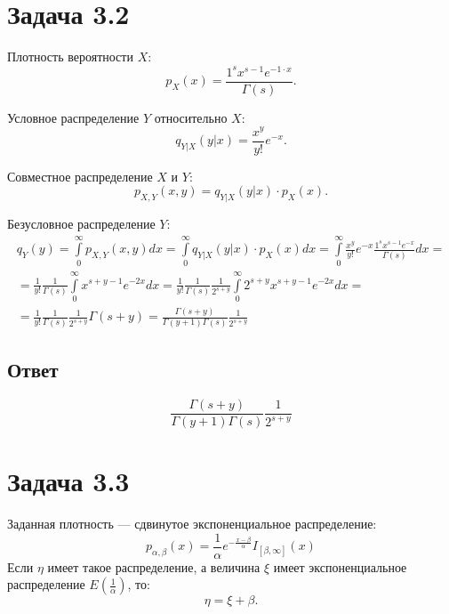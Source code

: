 \section*{Задача 3.2}
Плотность вероятности $X$:
\begin{equation}
    p_X(x) = \frac{1^s x^{s-1}e^{-1 \cdot x}}{\Gamma(s)} .
\end{equation}

Условное распределение $Y$ относительно $X$:
\begin{equation}
    q_{Y|X}(y|x) = \frac{x^y}{y!} e^{-x} .
\end{equation}

Совместное распределение $X$ и $Y$:
\begin{equation}
    p_{X,Y}(x,y) = q_{Y|X}(y|x) \cdot p_X(x) .
\end{equation}

Безусловное распределение $Y$:
\begin{multline}
    q_Y(y)
    = \int \limits_{0}^{\infty} p_{X,Y}(x,y) dx
    = \int \limits_{0}^{\infty} q_{Y|X}(y|x) \cdot p_X(x) dx
    = \int \limits_{0}^{\infty} \frac{x^y}{y!} e^{-x} \frac{1^s x^{s-1}e^{-x}}{\Gamma(s)} dx = \\
    = \frac{1}{y!} \frac{1}{\Gamma(s)} \int \limits_{0}^{\infty} x^{s+y-1}e^{-2 x} dx
    = \frac{1}{y!} \frac{1}{\Gamma(s)} \frac{1}{2^{s+y}} \int \limits_{0}^{\infty} 2^{s+y} x^{s+y-1}e^{-2 x} dx = \\
    = \frac{1}{y!} \frac{1}{\Gamma(s)} \frac{1}{2^{s+y}} \Gamma(s+y)
    = \frac{\Gamma(s+y)}{\Gamma(y+1) \Gamma(s)} \frac{1}{2^{s+y}}
\end{multline}

\subsection*{Ответ}
\begin{equation}
    \frac{\Gamma(s+y)}{\Gamma(y+1) \Gamma(s)} \frac{1}{2^{s+y}}
\end{equation}

\section*{Задача 3.3}
Заданная плотность --- сдвинутое экспоненциальное распределение:
\begin{equation}
    p_{\alpha, \beta} (x) = \frac{1}{\alpha} e^{- \frac{x - \beta}{\alpha}} I_{[\beta, \infty]}(x)
\end{equation}
Если $\eta$ имеет такое распределение, а величина $\xi$ имеет экспоненциальное распределение $E \left ( \frac{1}{\alpha} \right )$, то:
\begin{equation}
    \eta = \xi + \beta .
\end{equation}

